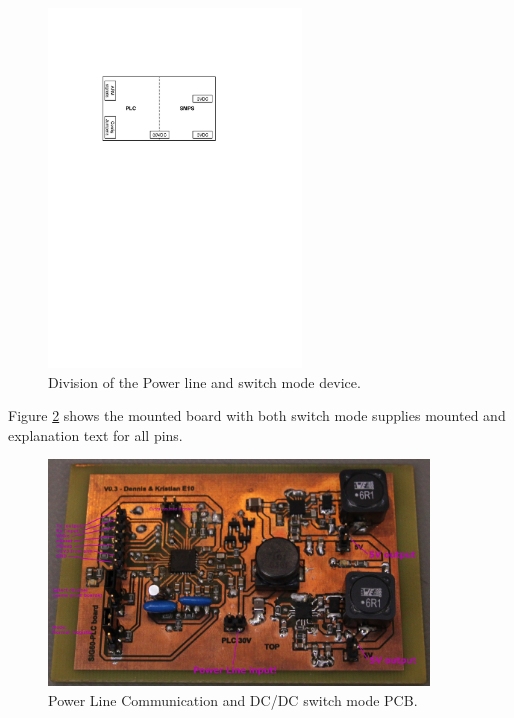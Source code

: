 \begin{figure}[H]
	\begin{centering}
		 \includegraphics[width=0.60\textwidth]{images/hw_plc_pcb_layout.pdf}
		\caption{Division of the Power line and switch mode device.}
		\label{fig:plc_and_smps}
	\end{centering}
\end{figure}
Figure \ref{fig:plc_and_smps_pic} shows the mounted board with both switch mode supplies mounted and explanation text for all pins.
\begin{figure}[H]
	\begin{centering}
		 \includegraphics[width=0.90\textwidth]{images/hw_plc_image.jpg}
		\caption{Power Line Communication and DC/DC switch mode PCB.}
		\label{fig:plc_and_smps_pic}
	\end{centering}
\end{figure}



